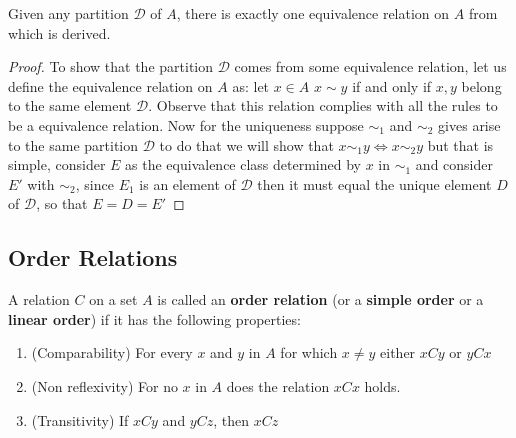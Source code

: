 \begin{lem}
	Given any partition $ \mathcal{D} $ of $ A $, there is exactly one equivalence relation on $ A $ from which is derived.
\end{lem}
\begin{proof}
	To show that the partition $ \mathcal{D} $ comes from some equivalence relation, let us define the equivalence relation on $ A $ as: let $ x \in A $ $ x \sim y $ if and only if $ x,y  $ belong to the same element $ \mathcal{D} $. Observe that this relation complies with all the rules to be a equivalence relation.
	Now for the uniqueness suppose $ \sim_1 $ and $ \sim_2 $ gives arise to the same partition $ \mathcal{D} $ to do that we will show that $ x \sim_1 y \iff x\sim_2y $ but that is simple, consider $ E $ as the equivalence class determined by $ x $ in $ \sim_1 $ and consider $ E' $ with $ \sim_2 $, since $ E_1 $ is an element of $ \mathcal{D} $ then it must equal the unique element $ D  $ of $ \mathcal{D} $, so that $ E = D =E' $
\end{proof}
\subsection*{Order Relations}
A relation $ C $ on a set $ A $ is called an \textbf{order relation} (or a \textbf{simple order} or a \textbf{linear order}) if it has the following properties:
\begin{enumerate}
	\item (Comparability) For every $ x $ and $ y $ in $ A $ for which $ x \neq y $ either $ xCy $ or $ yCx $
	\item (Non reflexivity) For no $ x $ in $ A $ does the relation $ xCx $ holds.
	\item (Transitivity) If $ xCy $ and $ yCz $, then $ xCz $
\end{enumerate}

